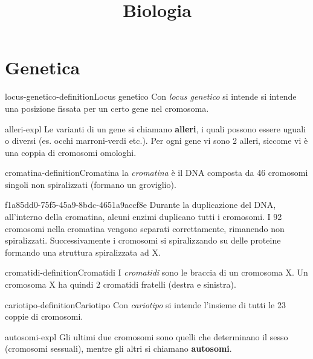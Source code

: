 \documentclass[preview]{standalone}
\begin{document}
\title{Biologia}
\genpage

\section{Genetica}

\begin{snippetdefinition}{locus-genetico-definition}{Locus genetico}
    Con \textit{locus genetico} si intende si intende una posizione fissata per
    un certo gene nel cromosoma.
\end{snippetdefinition}

\begin{snippet}{alleri-expl}
    Le varianti di un gene si chiamano \textbf{alleri}, i quali possono essere uguali o diversi
    (es. occhi marroni-verdi etc.). Per ogni gene vi sono 2 alleri, siccome vi è una coppia di cromosomi omologhi.
\end{snippet}

\begin{snippetdefinition}{cromatina-definition}{Cromatina}
    la \textit{cromatina} è il DNA composta da 46 cromosomi singoli non spiralizzati (formano un groviglio).
\end{snippetdefinition}

\begin{snippet}{f1a85dd0-75f5-45a9-8bdc-4651a9accf8e}
    Durante la duplicazione del DNA, all'interno della cromatina,
    alcuni enzimi duplicano tutti i cromosomi.
    I 92 cromosomi nella cromatina vengono separati correttamente, rimanendo non spiralizzati.
    Successivamente i cromosomi si spiralizzando su delle proteine formando una struttura spiralizzata ad X.
\end{snippet}


\begin{snippetdefinition}{cromatidi-definition}{Cromatidi}
    I \textit{cromatidi} sono le braccia di un cromosoma X.
    Un cromosoma X ha quindi 2 cromatidi fratelli (destra e sinistra).
\end{snippetdefinition}


\begin{snippetdefinition}{cariotipo-definition}{Cariotipo}
    Con \textit{cariotipo} si intende l'insieme di tutti le 23 coppie di cromosomi.
\end{snippetdefinition}

\begin{snippet}{autosomi-expl}
    Gli ultimi due cromosomi sono quelli che determinano il sesso (cromosomi sessuali),
    mentre gli altri si chiamano \textbf{autosomi}.
\end{snippet}

\end{document}
